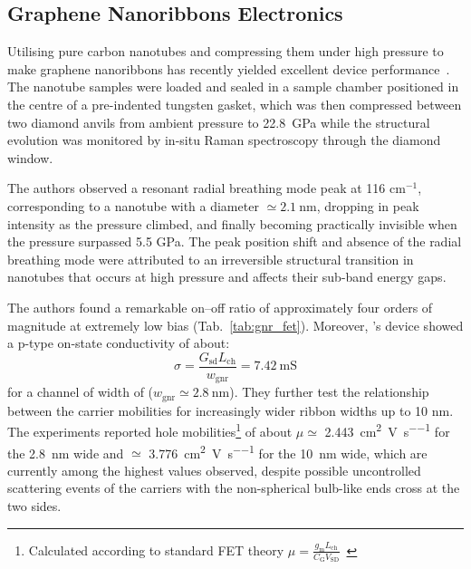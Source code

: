 \subsection{Graphene Nanoribbons Electronics}
Utilising pure carbon nanotubes and compressing them under high pressure to make graphene nanoribbons has recently yielded excellent device performance~\cite{chen2021sub}. The nanotube samples were loaded and sealed in a sample chamber positioned in the centre of a pre-indented tungsten gasket, which was then compressed between two diamond anvils from ambient pressure to \SI{22.8}{\giga\pascal} while the structural evolution was monitored by in-situ Raman spectroscopy through the diamond window.

The authors observed a resonant radial breathing mode peak at 116 cm$^{-1}$, corresponding to a nanotube with a diameter  $\simeq\SI{2.1}{\nano\metre}$, dropping in peak intensity as the pressure climbed, and finally becoming practically invisible when the pressure surpassed 5.5 GPa. The peak position shift and absence of the radial breathing mode were attributed to an irreversible structural transition in nanotubes that occurs at high pressure and affects their sub-band energy gaps.

The authors found a remarkable on--off ratio of approximately four orders of magnitude at extremely low bias (Tab.~\ref{tab:gnr_fet}). Moreover, \citeauthor{chen2021sub}'s device showed a p-type on-state conductivity of about:
%
\begin{equation}
    \sigma = \frac{G_\textrm{sd}L_\textrm{ch}}{w_\textrm{gnr}} = 7.42~\text{mS}
\end{equation}
%
for a channel of width of ($w_\textrm{gnr}\simeq \SI{2.8}{\nano\metre}$). They further test the relationship between the carrier mobilities for increasingly wider ribbon widths up to 10 nm. The experiments reported hole mobilities\footnote[2]{Calculated according to standard FET theory $\mu = \frac{g_\textrm{m}L_\textrm{ch}}{C_\textrm{G}V_\textrm{SD}}$~\cite{sze2021physics}} of about $\mu\simeq$ \SI{2,443}{\centi\metre\squared\per\volt\per\second} for the \SI{2.8}{\nano\metre} wide and $\simeq$ \SI{3.776}{\centi\metre\squared\per\volt\per\second} for the \SI{10}{\nano\metre} wide, which are currently among the highest values observed, despite possible uncontrolled scattering events of the carriers with the non-spherical bulb-like ends cross at the two sides.


